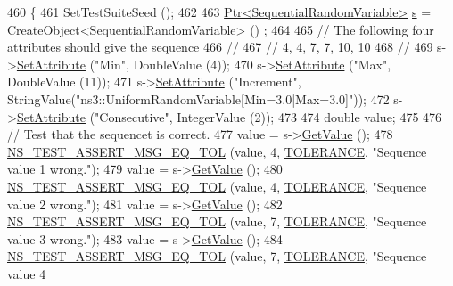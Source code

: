 \begin{DoxyCode}
460 \{
461   SetTestSuiteSeed ();
462 
463   \hyperlink{classns3_1_1Ptr}{Ptr<SequentialRandomVariable>} \hyperlink{generate__test__data__lte__sinr_8m_ad83eeb3a142285d1243a08c6b7026df8}{s} = CreateObject<SequentialRandomVariable> ()
      ;
464 
465   \textcolor{comment}{// The following four attributes should give the sequence}
466   \textcolor{comment}{//}
467   \textcolor{comment}{//    4, 4, 7, 7, 10, 10}
468   \textcolor{comment}{//}
469   s->\hyperlink{classns3_1_1ObjectBase_ac60245d3ea4123bbc9b1d391f1f6592f}{SetAttribute} (\textcolor{stringliteral}{"Min"}, DoubleValue (4));
470   s->\hyperlink{classns3_1_1ObjectBase_ac60245d3ea4123bbc9b1d391f1f6592f}{SetAttribute} (\textcolor{stringliteral}{"Max"}, DoubleValue (11));
471   s->\hyperlink{classns3_1_1ObjectBase_ac60245d3ea4123bbc9b1d391f1f6592f}{SetAttribute} (\textcolor{stringliteral}{"Increment"}, StringValue(\textcolor{stringliteral}{"ns3::UniformRandomVariable[Min=3.0|Max=3.0]"}));
472   s->\hyperlink{classns3_1_1ObjectBase_ac60245d3ea4123bbc9b1d391f1f6592f}{SetAttribute} (\textcolor{stringliteral}{"Consecutive"}, IntegerValue (2));
473 
474   \textcolor{keywordtype}{double} value;
475 
476   \textcolor{comment}{// Test that the sequencet is correct.}
477   value = s->\hyperlink{classns3_1_1SequentialRandomVariable_a78f36ee1a8102df7d7d40c4490ddf250}{GetValue} (); 
478   \hyperlink{group__testing_ga9e7861b56b4e70db3b56044cb7a28e41}{NS\_TEST\_ASSERT\_MSG\_EQ\_TOL} (value, 4, \hyperlink{classRandomVariableStreamSequentialTestCase_ad778eacda1b5bd5d31f802ad496db392}{TOLERANCE}, \textcolor{stringliteral}{"Sequence value 1
       wrong."}); 
479   value = s->\hyperlink{classns3_1_1SequentialRandomVariable_a78f36ee1a8102df7d7d40c4490ddf250}{GetValue} (); 
480   \hyperlink{group__testing_ga9e7861b56b4e70db3b56044cb7a28e41}{NS\_TEST\_ASSERT\_MSG\_EQ\_TOL} (value, 4, \hyperlink{classRandomVariableStreamSequentialTestCase_ad778eacda1b5bd5d31f802ad496db392}{TOLERANCE}, \textcolor{stringliteral}{"Sequence value 2
       wrong."}); 
481   value = s->\hyperlink{classns3_1_1SequentialRandomVariable_a78f36ee1a8102df7d7d40c4490ddf250}{GetValue} (); 
482   \hyperlink{group__testing_ga9e7861b56b4e70db3b56044cb7a28e41}{NS\_TEST\_ASSERT\_MSG\_EQ\_TOL} (value, 7, \hyperlink{classRandomVariableStreamSequentialTestCase_ad778eacda1b5bd5d31f802ad496db392}{TOLERANCE}, \textcolor{stringliteral}{"Sequence value 3
       wrong."}); 
483   value = s->\hyperlink{classns3_1_1SequentialRandomVariable_a78f36ee1a8102df7d7d40c4490ddf250}{GetValue} (); 
484   \hyperlink{group__testing_ga9e7861b56b4e70db3b56044cb7a28e41}{NS\_TEST\_ASSERT\_MSG\_EQ\_TOL} (value, 7, \hyperlink{classRandomVariableStreamSequentialTestCase_ad778eacda1b5bd5d31f802ad496db392}{TOLERANCE}, \textcolor{stringliteral}{"Sequence value 4
}
\end{DoxyCode}
